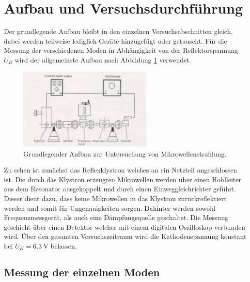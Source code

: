 \section{Aufbau und Versuchsdurchführung}

Der grundlegende Aufbau bleibt in den einzelnen Versuchsabschnitten gleich, dabei werden teilweise lediglich Geräte hinzugefügt oder getauscht. 
Für die Messung der verschiedenen Moden in Abhängigkeit von der Reflektorspannung $U_{R}$ wird der allgemeinste Aufbau nach Abbildung \ref{fig:1} verwendet.

\begin{figure}
    \centering
    \includegraphics[width=0.6\textwidth]{bilder/grundaufbau.png}
    \caption{Grundlegender Aufbau zur Untersuchung von Mikrowellenstrahlung. \cite{skript}} 
    \label{fig:1}
\end{figure}
Zu sehen ist zunächst das Reflexklystron welches an ein Netzteil angeschlossen ist. Die durch das Klystron erzeugten Mikrowellen werden über einen Hohlleiter aus dem Resonator ausgekoppelt und durch einen Einweggleichrichter geführt. 
Dieser dient dazu, dass keine Mikrowellen in das Klystron zurückreflektiert werden und somit für Ungenauigkeiten sorgen. 
Dahinter werden sowohl Frequenzmessgerät, als auch eine Dämpfungsquelle geschaltet. Die Messung geschieht über einen Detektor welcher mit einem digitalen Oszilloskop verbunden wird. 
Über den gesamten Versuchszeitraum wird die Kathodenspannung konstant bei $U_{K} = \SI{6.3}{\volt}$ belassen.

\subsection{Messung der einzelnen Moden}


